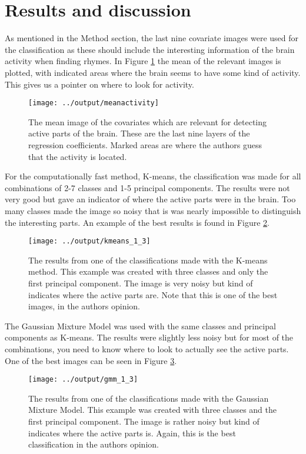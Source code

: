 \documentclass[a4paper,english]{article}
\begin{document}
\section{Results and discussion}

As mentioned in the Method section, the last nine covariate images were used for the classification as these should include the interesting information of the brain activity when finding rhymes. In Figure \ref{fig:mean} the mean of the relevant images is plotted, with indicated areas where the brain seems to have some kind of activity. This gives us a pointer on where to look for activity.

\begin{figure}[H]
	\centering
    \texttt{[image: ../output/meanactivity]}
    \caption{The mean image of the covariates which are relevant for detecting active parts of the brain. These are the last nine layers of the regression coefficients. Marked areas are where the authors guess that the activity is located.}
    \label{fig:mean}
\end{figure}

For the computationally fast method, K-means, the classification was made for all combinations of 2-7 classes and 1-5 principal components. The results were not very good but gave an indicator of where the active parts were in the brain. Too many classes made the image so noisy that is was nearly impossible to distinguish the interesting parts. An example of the best results is found in Figure \ref{fig:kmeans}.

\begin{figure}[H]
	\centering
    \texttt{[image: ../output/kmeans\_1\_3]}
    \caption{The results from one of the classifications made with the K-means method. This example was created with three classes and only the first principal component. The image is very noisy but kind of indicates where the active parts are. Note that this is one of the best images, in the authors opinion.}
    \label{fig:kmeans}
\end{figure}

The Gaussian Mixture Model was used with the same classes and principal components as K-means. The results were slightly less noisy but for most of the combinations, you need to know where to look to actually see the active parts. One of the best images can be seen in Figure \ref{fig:gmm}.

\begin{figure}[H]
  \centering
  \texttt{[image: ../output/gmm\_1\_3]}
  \caption{The results from one of the classifications made with the Gaussian Mixture Model. This example was created with three classes and the first principal component. The image is rather noisy but kind of indicates where the active parts is. Again, this is the best classification in the authors opinion.}
  \label{fig:gmm}
\end{figure}
\end{document}
